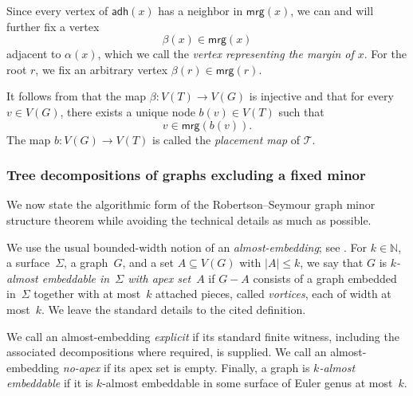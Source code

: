 \documentclass[1p,number,11pt]{elsarticle}
\theoremstyle{plain}
\newcommand{\mrg}{\mathsf{mrg}}
\newcommand{\adh}{\mathsf{adh}}
\renewcommand{\leq}{\leqslant}
\begin{document}
Since every vertex of $\adh(x)$ has a neighbor in $\mrg(x)$, we can and will further fix a vertex
\[
\beta(x)\in \mrg(x)
\]
adjacent to $\alpha(x)$, which we call the \emph{vertex representing the margin of $x$}. 
For the root $r$, we fix an arbitrary vertex $\beta(r)\in \mrg(r)$. 
\medskip




It follows from  that the map $\beta\colon V(T)\to V(G)$ is injective and that for every $v\in V(G)$, there exists a unique node $b(v)\in V(T)$ such that
\[
v\in \mrg(b(v)).
\]
The map $b:V(G)\rightarrow V(T)$ is called the \emph{placement map} of $\mathcal T$.


\subsubsection{Tree decompositions of graphs excluding a fixed minor}

We now state the algorithmic form of the Robertson--Seymour graph minor structure theorem while avoiding the technical details as much as possible. 

We use the usual bounded-width notion of an \emph{almost-embedding}; see
\cite[Section~5]{DujmovicMorinWood}.
For $k\in\mathbb N$, a surface~$\Sigma$, a graph~$G$, and a set
$A\subseteq V(G)$ with $|A|\leq k$, we say that $G$ is
\emph{$k$-almost embeddable in~$\Sigma$ with apex set~$A$} if $G-A$
consists of a graph embedded in~$\Sigma$ together with at most~$k$
attached pieces, called \emph{vortices}, each of width at most~$k$.
We leave the standard details to the cited definition.

We call an almost-embedding \emph{explicit} if its standard finite witness, including the associated decompositions where required, is supplied. 
We call an almost-embedding \emph{no-apex} if its apex set is empty. 
Finally, a graph is  \emph{$k$-almost embeddable} if it is $k$-almost embeddable in some surface of Euler genus at most~$k$.
\end{document}
